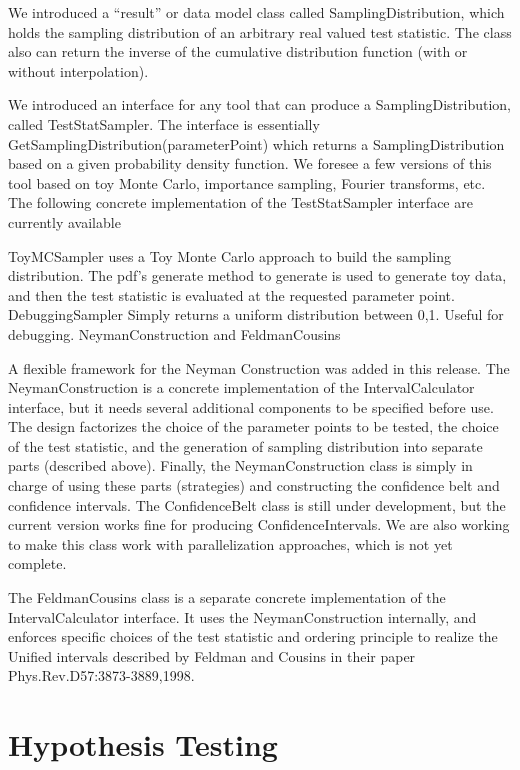 \documentclass[11pt]{article}
\begin{document}
We introduced a ``result'' or data model class called SamplingDistribution, which holds the sampling distribution of an arbitrary real valued test statistic.  The class also can return the inverse of the cumulative distribution function (with or without interpolation).  

We introduced an interface for any tool that can produce a SamplingDistribution, called TestStatSampler.  The interface is essentially GetSamplingDistribution(parameterPoint) which returns a SamplingDistribution based on a given probability density function.  We foresee a few versions of this tool based on toy Monte Carlo, importance sampling, Fourier transforms, etc.  The following concrete implementation of the TestStatSampler interface are currently available

ToyMCSampler uses a Toy Monte Carlo approach to build the sampling distribution.  The pdf's generate method to generate is used to generate toy data, and then the test statistic is evaluated at the requested parameter point.
DebuggingSampler Simply returns a uniform distribution between 0,1.  Useful for debugging.
NeymanConstruction and FeldmanCousins

A flexible framework for the Neyman Construction was added in this release. The NeymanConstruction is a concrete implementation of the IntervalCalculator interface, but it needs several additional components to be specified before use. The design factorizes the choice of the parameter points to be tested, the choice of the test statistic, and the generation of sampling distribution into separate parts (described above).  Finally, the NeymanConstruction class is simply in charge of using these parts (strategies) and constructing the confidence belt and confidence intervals.  The ConfidenceBelt class is still under development, but the current version works fine for producing ConfidenceIntervals.  We are also working to make this class work with parallelization approaches, which is not yet complete.

The FeldmanCousins class is a separate concrete implementation of the IntervalCalculator interface.  It uses the NeymanConstruction internally, and enforces specific choices of the test statistic and ordering principle to realize the Unified intervals described by Feldman and Cousins in their paper Phys.Rev.D57:3873-3889,1998.

\section{Hypothesis Testing}
\end{document}
